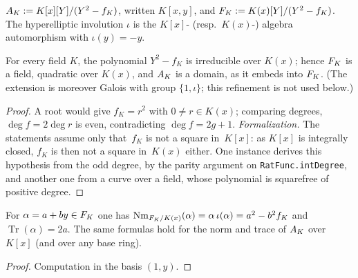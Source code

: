\begin{definition}
\label{def:hypring}
\leanok
$A_{K} := K[x][Y]/(Y^2 - f_K)$, written $K[x,y]$, and
$F_{K} := K(x)[Y]/(Y^2 - f_K)$. The hyperelliptic involution $\iota$ is the $K[x]$-
(resp.\ $K(x)$-) algebra automorphism with $\iota(y) = -y$.
\end{definition}

\begin{lemma}[Irreducibility]
\label{lem:hyp-irred}
\leanok
{}
For every field $K$, the polynomial $Y^2 - f_K$ is irreducible over $K(x)$; hence $F_{K}$
is a field, quadratic over $K(x)$, and $A_{K}$ is a domain, as it embeds into $F_{K}$.
(The extension is moreover Galois with group $\{1,\iota\}$; this refinement is not used
below.)
\end{lemma}
\begin{proof}
\leanok
A root would give $f_K = r^2$ with $0 \ne r \in K(x)$; comparing degrees,
$\deg f = 2\deg r$ is even, contradicting $\deg f = 2g+1$. \emph{Formalization.} The
statements assume only that~$f_K$ is not a square in~$K[x]$: as $K[x]$ is integrally closed,
$f_K$ is then not a square in~$K(x)$ either. One instance derives this hypothesis from the odd
degree, by the parity argument on \texttt{RatFunc.intDegree}, and another one from a curve over
a field, whose polynomial is squarefree of positive degree.
\end{proof}

\begin{lemma}
\label{lem:normform}
\leanok
{}
For $\alpha = a + by \in F_{K}$ one has
$\operatorname{Nm}_{F_{K}/K(x)}(\alpha) = \alpha\,\iota(\alpha) = a^2 - b^2 f_K$
and $\operatorname{Tr}(\alpha) = 2a$. The same formulas hold for the norm and trace of
$A_{K}$ over $K[x]$ (and over any base ring).
\end{lemma}
\begin{proof}
\leanok
Computation in the basis $(1,y)$.
\end{proof}


